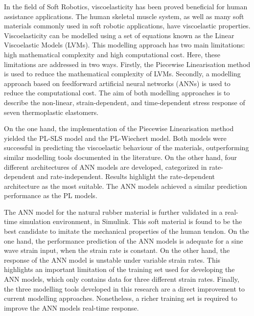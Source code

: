 


\begin{abstracts}        %



In the field of Soft Robotics, viscoelasticity has been proved beneficial for human assistance applications. The human skeletal muscle system, as well as many soft materials commonly used in soft robotic applications, have viscoelastic properties. Viscoelasticity can be modelled using a set of equations known as the Linear Viscoelastic Models (LVMs). This modelling approach has two main limitations: high mathematical complexity and high computational cost. Here, these limitations are addressed in two ways. Firstly, the Piecewise Linearisation method is used to reduce the mathematical complexity of LVMs. Secondly, a modelling approach based on feedforward artificial neural networks (ANNs) is used to reduce the computational cost. The aim of both modelling approaches is to describe the non-linear, strain-dependent, and time-dependent stress response of seven thermoplastic elastomers.

On the one hand, the implementation of the Piecewise Linearisation method yielded the PL-SLS model and the PL-Wiechert model. Both models were successful in predicting the viscoelastic behaviour of the materials, outperforming similar modelling tools documented in the literature. On the other hand, four different architectures of ANN models are developed, categorized in rate-dependent and rate-independent. Results highlight the rate-dependent architecture as the most suitable. The ANN models achieved a similar prediction performance as the PL models. 

The ANN model for the natural rubber material is further validated in a real-time simulation environment, in Simulink. This soft material is found to be the best candidate to imitate the mechanical properties of the human tendon. On the one hand, the performance prediction of the ANN models is adequate for a sine wave strain input, when the strain rate is constant. On the other hand, the response of the ANN model is unstable under variable strain rates. This highlights an important limitation of the training set used for developing the ANN models, which only contains data for three different strain rates. Finally, the three modelling tools developed in this research are a direct improvement to current modelling approaches. Nonetheless, a richer training set is required to improve the ANN models real-time response.


\end{abstracts}
